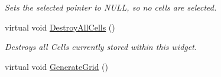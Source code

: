 \begin{DoxyCompactItemize}
\begin{DoxyCompactList}\small\item\em Sets the selected pointer to NULL, so no cells are selected. \item\end{DoxyCompactList}\item 
\hypertarget{classphys_1_1UI_1_1CellGrid_a12736adff3718820b4915cbe9961c66f}{
virtual void \hyperlink{classphys_1_1UI_1_1CellGrid_a12736adff3718820b4915cbe9961c66f}{DestroyAllCells} ()}
\label{classphys_1_1UI_1_1CellGrid_a12736adff3718820b4915cbe9961c66f}

\begin{DoxyCompactList}\small\item\em Destroys all Cells currently stored within this widget. \item\end{DoxyCompactList}\item 
\hypertarget{classphys_1_1UI_1_1CellGrid_a7a990cd514b6c02ea8f7747b0b058c93}{
virtual void \hyperlink{classphys_1_1UI_1_1CellGrid_a7a990cd514b6c02ea8f7747b0b058c93}{GenerateGrid} ()}
\label{classphys_1_1UI_1_1CellGrid_a7a990cd514b6c02ea8f7747b0b058c93}


\end{DoxyCompactItemize}
